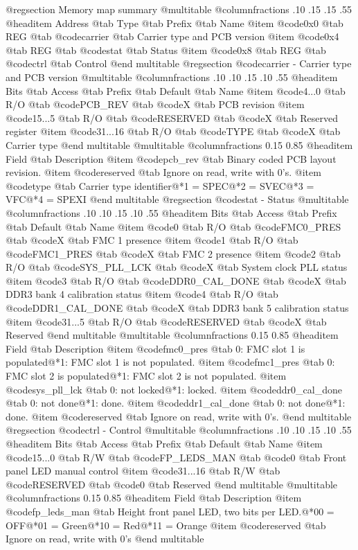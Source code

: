 @regsection Memory map summary
@multitable  @columnfractions .10 .15 .15 .55
@headitem Address @tab Type @tab Prefix @tab Name
@item @code{0x0} @tab
REG @tab
@code{carrier} @tab
Carrier type and PCB version
@item @code{0x4} @tab
REG @tab
@code{stat} @tab
Status
@item @code{0x8} @tab
REG @tab
@code{ctrl} @tab
Control
@end multitable 
@regsection @code{carrier} - Carrier type and PCB version
@multitable @columnfractions .10 .10 .15 .10 .55
@headitem Bits @tab Access @tab Prefix @tab Default @tab Name
@item @code{4...0}
@tab R/O @tab
@code{PCB_REV}
@tab @code{X} @tab 
PCB revision
@item @code{15...5}
@tab R/O @tab
@code{RESERVED}
@tab @code{X} @tab 
Reserved register
@item @code{31...16}
@tab R/O @tab
@code{TYPE}
@tab @code{X} @tab 
Carrier type
@end multitable
@multitable @columnfractions 0.15 0.85
@headitem Field @tab Description
@item @code{pcb_rev} @tab Binary coded PCB layout revision.
@item @code{reserved} @tab Ignore on read, write with 0's.
@item @code{type} @tab Carrier type identifier@*1 = SPEC@*2 = SVEC@*3 = VFC@*4 = SPEXI
@end multitable
@regsection @code{stat} - Status
@multitable @columnfractions .10 .10 .15 .10 .55
@headitem Bits @tab Access @tab Prefix @tab Default @tab Name
@item @code{0}
@tab R/O @tab
@code{FMC0_PRES}
@tab @code{X} @tab 
FMC 1 presence
@item @code{1}
@tab R/O @tab
@code{FMC1_PRES}
@tab @code{X} @tab 
FMC 2 presence
@item @code{2}
@tab R/O @tab
@code{SYS_PLL_LCK}
@tab @code{X} @tab 
System clock PLL status
@item @code{3}
@tab R/O @tab
@code{DDR0_CAL_DONE}
@tab @code{X} @tab 
DDR3 bank 4 calibration status
@item @code{4}
@tab R/O @tab
@code{DDR1_CAL_DONE}
@tab @code{X} @tab 
DDR3 bank 5 calibration status
@item @code{31...5}
@tab R/O @tab
@code{RESERVED}
@tab @code{X} @tab 
Reserved
@end multitable
@multitable @columnfractions 0.15 0.85
@headitem Field @tab Description
@item @code{fmc0_pres} @tab 0: FMC slot 1 is populated@*1: FMC slot 1 is not populated.
@item @code{fmc1_pres} @tab 0: FMC slot 2 is populated@*1: FMC slot 2 is not populated.
@item @code{sys_pll_lck} @tab 0: not locked@*1: locked.
@item @code{ddr0_cal_done} @tab 0: not done@*1: done.
@item @code{ddr1_cal_done} @tab 0: not done@*1: done.
@item @code{reserved} @tab Ignore on read, write with 0's.
@end multitable
@regsection @code{ctrl} - Control
@multitable @columnfractions .10 .10 .15 .10 .55
@headitem Bits @tab Access @tab Prefix @tab Default @tab Name
@item @code{15...0}
@tab R/W @tab
@code{FP_LEDS_MAN}
@tab @code{0} @tab 
Front panel LED manual control
@item @code{31...16}
@tab R/W @tab
@code{RESERVED}
@tab @code{0} @tab 
Reserved
@end multitable
@multitable @columnfractions 0.15 0.85
@headitem Field @tab Description
@item @code{fp_leds_man} @tab Height front panel LED, two bits per LED.@*00 = OFF@*01 = Green@*10 = Red@*11 = Orange
@item @code{reserved} @tab Ignore on read, write with 0's
@end multitable
